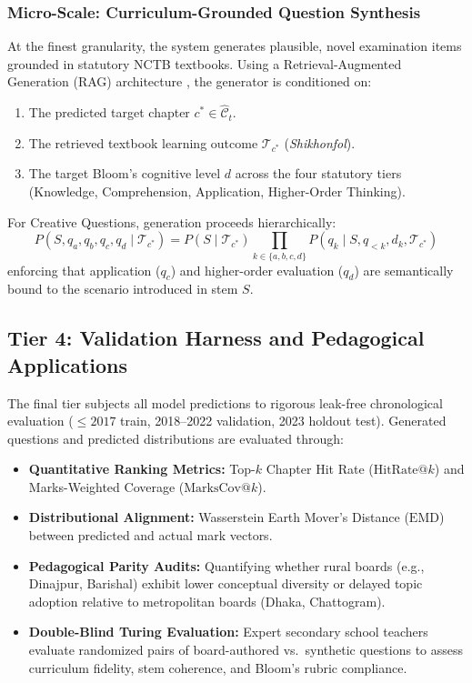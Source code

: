 \documentclass[11pt,a4paper]{article}
\begin{document}
\subsubsection{Micro-Scale: Curriculum-Grounded Question Synthesis}
At the finest granularity, the system generates plausible, novel examination items grounded in statutory NCTB textbooks. Using a Retrieval-Augmented Generation (RAG) architecture \cite{lewis2020rag, du2017learning, wang2018question}, the generator is conditioned on:
\begin{enumerate}[noitemsep]
    \item The predicted target chapter $c^* \in \hat{\mathcal{C}}_t$.
    \item The retrieved textbook learning outcome $\mathcal{T}_{c^*}$ (\textsl{Shikhonfol}).
    \item The target Bloom's cognitive level $d$ across the four statutory tiers (Knowledge, Comprehension, Application, Higher-Order Thinking).
\end{enumerate}
For Creative Questions, generation proceeds hierarchically:
\begin{equation}
    P(S, q_a, q_b, q_c, q_d \mid \mathcal{T}_{c^*}) = P(S \mid \mathcal{T}_{c^*}) \prod_{k \in \{a,b,c,d\}} P(q_k \mid S, q_{<k}, d_k, \mathcal{T}_{c^*})
\end{equation}
enforcing that application ($q_c$) and higher-order evaluation ($q_d$) are semantically bound to the scenario introduced in stem $S$.

\subsection{Tier 4: Validation Harness and Pedagogical Applications}
The final tier subjects all model predictions to rigorous leak-free chronological evaluation ($\le 2017$ train, 2018--2022 validation, 2023 holdout test). Generated questions and predicted distributions are evaluated through:
\begin{itemize}[noitemsep,topsep=2pt]
    \item \textbf{Quantitative Ranking Metrics:} Top-$k$ Chapter Hit Rate ($\text{HitRate}@k$) and Marks-Weighted Coverage ($\text{MarksCov}@k$).
    \item \textbf{Distributional Alignment:} Wasserstein Earth Mover's Distance ($\text{EMD}$) between predicted and actual mark vectors.
    \item \textbf{Pedagogical Parity Audits:} Quantifying whether rural boards (e.g., Dinajpur, Barishal) exhibit lower conceptual diversity or delayed topic adoption relative to metropolitan boards (Dhaka, Chattogram).
    \item \textbf{Double-Blind Turing Evaluation:} Expert secondary school teachers evaluate randomized pairs of board-authored vs.\ synthetic questions to assess curriculum fidelity, stem coherence, and Bloom's rubric compliance.
\end{itemize}
\end{document}
